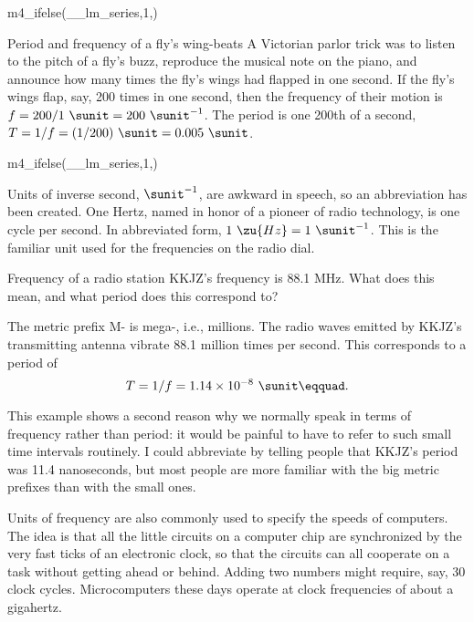m4_ifelse(__lm_series,1,\vspace{10mm})


\begin{eg}{Period and frequency of a fly's wing-beats}
A Victorian parlor trick was to listen to the pitch of a
fly's buzz, reproduce the musical note on the piano, and
announce how many times the fly's wings had flapped in one
second. If the fly's wings flap, say, 200 times in one
second, then the frequency of their motion is $f=200/1\ \sunit=200\ \sunit^{-1}$.
The period is one 200th of a second, $T=1/f=(1/200)\ \sunit=0.005\ \sunit$.
\end{eg}

m4_ifelse(__lm_series,1,\pagebreak[4])

Units of inverse second, $\sunit^{-1}$, are awkward in speech, so an
abbreviation has been created. One Hertz, named in honor of
a pioneer of radio technology, is one cycle per second. In
abbreviated form, $1\ \zu{Hz}=1\ \sunit^{-1}$. This is the familiar unit
used for the frequencies on the radio dial.

\begin{eg}{Frequency of a radio station}
\egquestion KKJZ's frequency is 88.1 MHz. What does this mean,
and what period does this correspond to?

\eganswer The metric prefix M- is mega-, i.e., millions. The
radio waves emitted by KKJZ's transmitting antenna vibrate
88.1 million times per second. This corresponds to a period of
\begin{equation*}
 T = 1/f= 1.14\times10^{-8}\ \sunit\eqquad.
\end{equation*}

This example shows a second reason why we normally speak in
terms of frequency rather than period: it would be painful
to have to refer to such small time intervals routinely. I
could abbreviate by telling people that KKJZ's period was
11.4 nanoseconds, but most people are more familiar with the
big metric prefixes than with the small ones.
\end{eg}

Units of frequency are also commonly used to specify the
speeds of computers. The idea is that all the little
circuits on a computer chip are synchronized by the very
fast ticks of an electronic clock, so that the circuits can
all cooperate on a task without getting ahead or behind.
Adding two numbers might require, say, 30 clock cycles.
Microcomputers these days operate at clock frequencies
of about a gigahertz.

